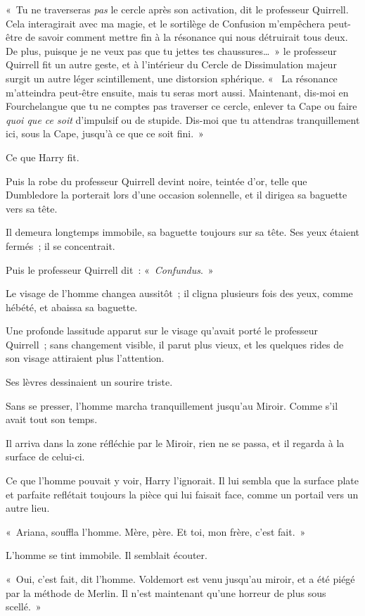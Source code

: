 «~Tu ne traverseras \emph{pas} le cercle après son activation, dit le professeur Quirrell.
Cela interagirait avec ma magie, et le sortilège de Confusion m'empêchera peut-être de savoir comment mettre fin à la résonance qui nous détruirait tous deux.
De plus, puisque je ne veux pas que tu jettes tes chaussures…~»
le professeur Quirrell fit un autre geste, et à l'intérieur du Cercle de Dissimulation majeur surgit un autre léger scintillement, une distorsion sphérique.
«~ La résonance m'atteindra peut-être ensuite, mais tu seras mort aussi.
Maintenant, dis-moi en Fourchelangue que tu ne comptes pas traverser ce cercle, enlever ta Cape ou faire \emph{quoi que ce soit} d'impulsif ou de stupide.
Dis-moi que tu attendras tranquillement ici, sous la Cape, jusqu'à ce que ce soit fini.~»

Ce que Harry fit.

Puis la robe du professeur Quirrell devint noire, teintée d'or, telle que Dumbledore la porterait lors d'une occasion solennelle, et il dirigea sa baguette vers sa tête.

Il demeura longtemps immobile, sa baguette toujours sur sa tête.
Ses yeux étaient fermés~; il se concentrait.

Puis le professeur Quirrell dit~: «~\emph{Confundus}.~»

Le visage de l'homme changea aussitôt~; il cligna plusieurs fois des yeux, comme hébété, et abaissa sa baguette.

Une profonde lassitude apparut sur le visage qu'avait porté le professeur Quirrell~; sans changement visible, il parut plus vieux, et les quelques rides de son visage attiraient plus l'attention.

Ses lèvres dessinaient un sourire triste.

Sans se presser, l'homme marcha tranquillement jusqu'au Miroir.
Comme s'il avait tout son temps.

Il arriva dans la zone réfléchie par le Miroir, rien ne se passa, et il regarda à la surface de celui-ci.

Ce que l'homme pouvait y voir, Harry l'ignorait.
Il lui sembla que la surface plate et parfaite reflétait toujours la pièce qui lui faisait face, comme un portail vers un autre lieu.

«~Ariana, souffla l'homme.
Mère, père.
Et toi, mon frère, c'est fait.~»

L'homme se tint immobile.
Il semblait écouter.

«~Oui, c'est fait, dit l'homme.
Voldemort est venu jusqu'au miroir, et a été piégé par la méthode de Merlin.
Il n'est maintenant qu'une horreur de plus sous scellé.~»

